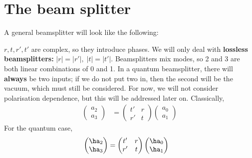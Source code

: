 \documentclass[a4paper, 11pt, normalem]{report}
\begin{document}
\section{The beam splitter}
A general beamsplitter will look like the following:
\begin{figure}[H]
    \centering
\end{figure}
$r,t,r',t'$ are complex, so they introduce phases. 
We will only deal with \textbf{lossless beamsplitters:} $|r| = |r'|,\; |t| = |t'|$.
Beamsplitters mix modes, so 2 and 3 are both linear combinations of 0 and 1.
In a quantum beamsplitter, there will \textbf{always} be two inputs; if we do not put two in, then the second will be the vacuum, which must still be considered.
For now, we will not consider polarisation dependence, but this will be addressed later on. 
Classically,
\begin{align}
    \begin{pmatrix} a_2\\a_3\end{pmatrix} &= \begin{pmatrix} t' & r \\ r' & t\end{pmatrix} \begin{pmatrix}a_0\\a_1\end{pmatrix}
\end{align}
For the quantum case, 
\begin{align}
    \begin{pmatrix} \ha_2\\ \ha_3\end{pmatrix} &= \begin{pmatrix} t' & r \\ r' & t\end{pmatrix} \begin{pmatrix}\ha_0\\ \ha_1\end{pmatrix} 
\end{align}
\end{document}
